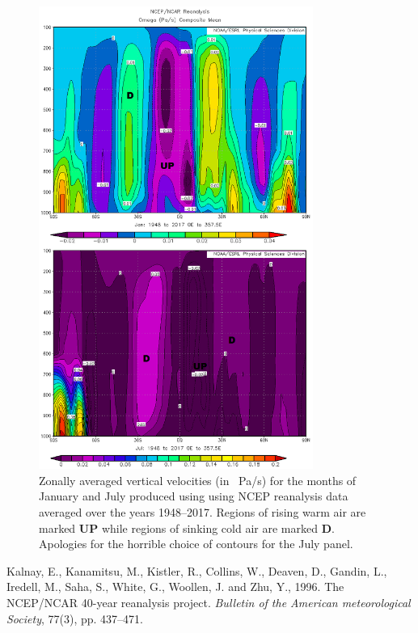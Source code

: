 \documentclass[11pt]{article}
\begin{document}
\begin{figure}[h!]
  \centering
  \includegraphics[width=0.8\textwidth]{omega_janjul.png}
  \caption{Zonally averaged vertical velocities (in \SI{}{\Pa/\s}) for the months of January and July produced using using NCEP reanalysis data averaged over the years 1948--2017. Regions of rising warm air are marked \textbf{UP} while regions of sinking cold air are marked \textbf{D}. Apologies for the horrible choice of contours for the July panel.}
  \label{fig:omega}
\end{figure}


\begin{thebibliography}{9}
Kalnay, E., Kanamitsu, M., Kistler, R., Collins, W., Deaven, D., Gandin, L., Iredell, M., Saha, S., White, G., Woollen, J. and Zhu, Y., 1996. The NCEP/NCAR 40-year reanalysis project. \textit{Bulletin of the American meteorological Society}, 77(3), pp. 437--471.
\end{thebibliography}
\end{document}
